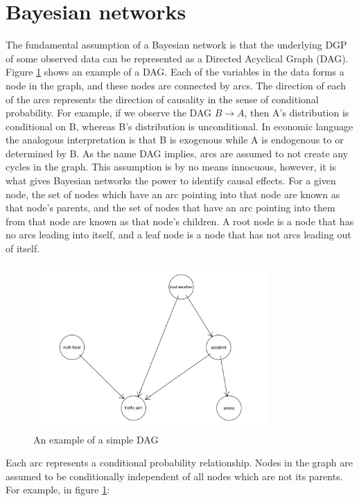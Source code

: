 \documentclass{article}
\begin{document}
\section{Bayesian networks}

The fundamental assumption of a Bayesian network is that the underlying DGP of some observed data can be represented as a Directed Acyclical Graph (DAG). Figure \ref{dag1} shows an example of a DAG. Each of the variables in the data forms a node in the graph, and these nodes are connected by arcs. The direction of each of the arcs represents the direction of causality in the sense of conditional probability. For example, if we observe the DAG $B \rightarrow A$, then A's distribution is conditional on B, whereas B's distribution is unconditional. In economic language the analogous interpretation is that B is exogenous while A is endogenous to or determined by B. As the name DAG implies, arcs are assumed to not create any cycles in the graph. This assumption is by no means innocuous, however, it is what gives Bayesian networks the power to identify causal effects. For a given node, the set of nodes which have an arc pointing into that node are known as that node's parents, and the set of nodes that have an arc pointing into them from that node are known as that node's children. A root node is a node that has no arcs leading into itself, and a leaf node is a node that has not arcs leading out of itself.

\begin{figure}
  \centering
  \includegraphics[width=0.8\textwidth]{images/trafficjam.png}
  \caption{An example of a simple DAG \parencite{traffic_jam}}
  \label{dag1}
\end{figure}

Each arc represents a conditional probability relationship. Nodes in the graph are assumed to be conditionally independent of all nodes which are not its parents. For example, in figure \ref{dag1}: 
\end{document}
